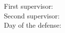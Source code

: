 \thispagestyle{empty}

  \begin{flushleft}
    {\large
     First supervisor:  \getSupervisorOne{} \\[1mm]
     Second supervisor: \getSupervisorTwo{} \\[1mm]
     Day of the defense: \getExamDate{} \\
     }
  \end{flushleft}

\cleardoublepage{}
